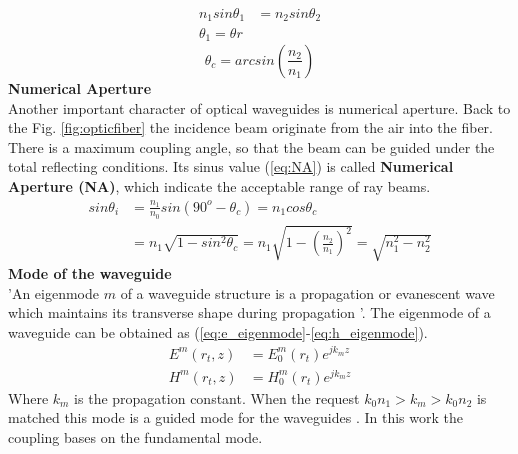 \begin{align}
n_{1}sin\theta_{1}&=n_{2}sin\theta_{2}
\label{eq:snell}\\
\theta_{1}=\theta{r}
\label{eq:reflection}
\end{align}
\begin{equation}
\theta_{c}=arcsin(\frac{n_{2}}{n_{1}})
\label{eq:critical_angle}
\end{equation}
\textbf{ Numerical Aperture }\\
Another important character of optical waveguides is numerical aperture. Back to the Fig. \ref{fig:opticfiber} the incidence beam originate from the air into the fiber. There is a maximum coupling angle, so that the beam can be guided under the total reflecting conditions. Its sinus value (\ref{eq:NA}) is called \textbf{Numerical Aperture (NA)}, which indicate the acceptable range of ray beams.
\begin{align}
sin\theta_{i}&=\frac{n_{1}}{n_{0}}sin(90^{o}-\theta_{c})=n_{1}cos\theta_{c} \nonumber\\
&=n_{1}\sqrt{1-sin^{2}\theta_{c}}=n_{1}\sqrt{1-\left(\frac{n_{2}}{n_{1}}\right)^2}=\sqrt{n^2_{1}-n^2_{2}}
\label{eq:NA}
\end{align}
\textbf{Mode of the waveguide}\\
'An eigenmode $m$ of a waveguide structure is a propagation or evanescent wave which maintains its transverse shape during propagation '\cite{integrated_optics}. The eigenmode of a waveguide can be obtained as (\ref{eq:e_eigenmode}-\ref{eq:h_eigenmode}). 
\begin{align}
E^{m}(r_{t},z)&=E^{m}_{0}(r_{t})e^{jk_{m}z}
\label{eq:e_eigenmode}\\
H^{m}(r_{t},z)&=H^{m}_{0}(r_{t})e^{jk_{m}z}
\label{eq:h_eigenmode}
\end{align}
Where $k_{m}$ is the propagation constant. When the request  $k_{0}n_{1}>k_{m}>k_{0}n_{2}$ is matched this mode is a guided mode for the waveguides \cite{script_FT_TET}. In this work the coupling bases on the fundamental mode.

